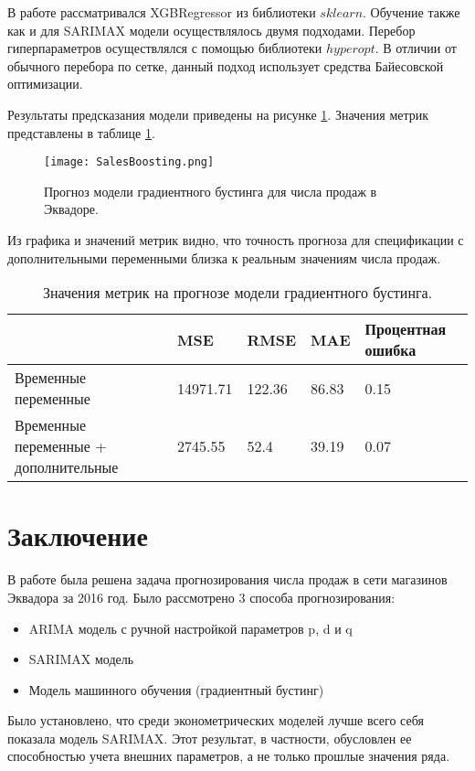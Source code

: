 \documentclass[]{article}
\begin{document}
В работе рассматривался XGBRegressor из библиотеки $sklearn$. Обучение также как и для SARIMAX модели осуществлялось двумя подходами. Перебор гиперпараметров осуществлялся с помощью библиотеки $hyperopt$. В отличии от обычного перебора по сетке, данный подход использует средства Байесовской оптимизации. 

Результаты предсказания модели приведены на рисунке \ref{fig:boosting}. Значения метрик представлены в таблице  \ref{tab:boosting}.

\begin{figure}[h!]
	\centering
	\texttt{[image: SalesBoosting.png]}
	\caption{Прогноз модели градиентного бустинга для числа продаж в Эквадоре.}
	\label{fig:boosting}
\end{figure}

Из графика и значений метрик видно, что точность прогноза для спецификации с дополнительными переменными близка к реальным значениям числа продаж. 

\begin{table}[h]
	\centering
	\caption{Значения метрик на прогнозе модели градиентного бустинга.}
	\begin{tabularx}{\textwidth}{|X|l|l|l|l|}
		\hline
					& MSE          & RMSE   & MAE   & Процентная ошибка \\ \hline
		{Временные переменные}                  & 14971.71 & 122.36 & 86.83 & 0.15 \\ \hline
	    {Временные переменные + дополнительные} & 2745.55  & 52.4   & 39.19 & 0.07 \\ \hline
	\end{tabularx}
	\label{tab:boosting}
\end{table}

\section{Заключение}

 В работе была решена задача прогнозирования числа продаж в сети магазинов Эквадора за 2016 год. Было рассмотрено 3 способа прогнозирования:
 \begin{itemize}
 	\item ARIMA модель с ручной настройкой параметров p, d и q
 	\item SARIMAX модель
 	\item Модель машинного обучения (градиентный бустинг)
 \end{itemize}
 
 Было установлено, что среди эконометрических моделей лучше всего себя показала модель SARIMAX. Этот результат, в частности, обусловлен ее способностью учета внешних параметров, а не только прошлые значения ряда. 
 
\end{document}
